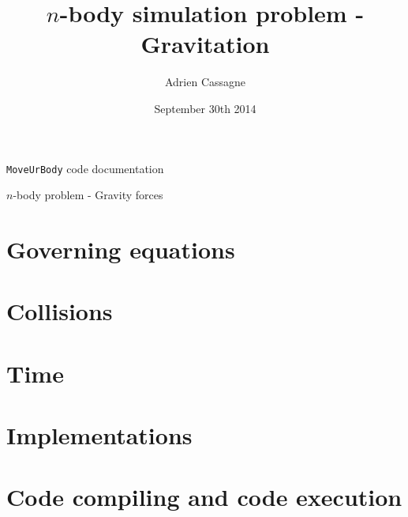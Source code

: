\documentclass[a4paper,11pt,answers,11pt]{paper}
\title{$n$-body simulation problem - Gravitation}
\author{Adrien Cassagne}
\date{September 30th 2014}
\begin{document}
\begin{title}
\noindent{}
\begin{center}
	{\Large{\texttt{MoveUrBody} code documentation}}\\
\end{center}
\begin{center}
	{\footnotesize{$n$-body problem - Gravity forces}}
\end{center}
\end{title}

\setcounter{page}{1}
\section {Governing equations}


\section {Collisions}


\newpage
\section {Time}


\newpage
\section {Implementations}


\newpage
\section {Code compiling and code execution}

\end{document}
